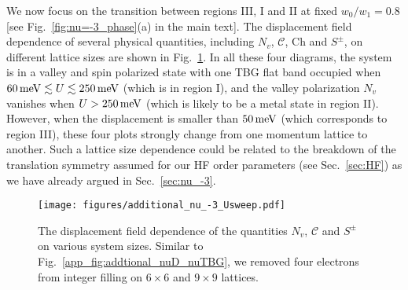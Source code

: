 \documentclass[prb,aps,nofootinbib,amssymb,twocolumn,superscriptaddress,10pt]{revtex4-2}
\begin{document}
\begin{widetext}
We now focus on the transition between regions III, I and II at fixed $w_0/w_1=0.8$ [see Fig.~\ref{fig:nu=-3_phase}(a) in the main text]. The displacement field dependence of several physical quantities, including $N_v$, $\mathcal{C}$, $\mathrm{Ch}$ and $S^\pm$, on different lattice sizes are shown in Fig.~\ref{app_fig:additional_nu_-3_Usweep}. In all these four diagrams, the system is in a valley and spin polarized state with one TBG flat band occupied when $60{\rm\, meV} \lesssim U \lesssim 250{\rm\, meV}$ (which is in region I), and the valley polarization $N_v$ vanishes when $U > 250\,\rm meV$ (which is likely to be a metal state in region II). However, when the displacement is smaller than $50\rm\,meV$ (which corresponds to region III), these four plots strongly change from one momentum lattice to another. 
Such a lattice size dependence could be related to the breakdown of the translation symmetry assumed for our HF order parameters (see Sec.~\ref{sec:HF}) as we have already argued in Sec.~\ref{sec:nu_-3}.


\begin{figure}[!htbp]
	\centering
	\texttt{[image: figures/additional\_nu\_-3\_Usweep.pdf]}
	\caption{The displacement field dependence of the quantities $N_v$, $\mathcal{C}$ and $S^\pm$ on various system sizes. Similar to Fig.~\ref{app_fig:addtional_nuD_nuTBG}, we removed four electrons from integer filling on $6\times 6$ and $9\times 9$ lattices.}
	\label{app_fig:additional_nu_-3_Usweep}
\end{figure}


\end{widetext}
\end{document}
